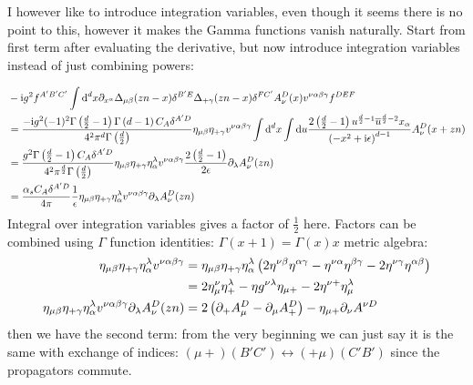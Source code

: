 I however like to introduce integration variables, even though it seems there is no point to this, however it makes the Gamma functions vanish naturally. Start from first term after evaluating the derivative, but now introduce integration variables instead of just combining powers:

\begin{align}
	&-\text{i} g^2f^{A'B'C'} \int \text{d} ^d x\partial_{x^\alpha} \Delta_{\mu \beta}(zn-x) \delta^{B' E} \Delta_{+ \gamma}(zn-x) \delta^{FC'} A_\nu^D(x) v^{\nu\alpha\beta\gamma} f^{DEF}
	\\
	&=
	\frac{-\text{i} g^2 (-1)^2 \Gamma\left(\frac{d}{2}-1\right)\Gamma\left(d-1\right)C_A\delta^{A'D}}{4^2 \pi^d\Gamma\left(\frac{d}{2}\right)} \eta_{\mu\beta} \eta_{+\gamma}v^{\nu\alpha\beta\gamma}\int \text{d} ^d x \int \text{d} u  \frac{2\left(\frac{d}{2}-1\right)u^{\frac{d}{2}-1}\overline u ^{\frac{d}{2}-2}x_\alpha}{\left(-x^2+\text{i} \epsilon\right)^{d-1}}A_\nu^D(x+zn)
	\\
	&=
	\frac{ g^2  \Gamma\left(\frac{d}{2}-1\right)C_A\delta^{A'D}}{4^2 \pi^{\frac{d}{2}}\Gamma\left(\frac{d}{2}\right)} \eta_{\mu\beta} \eta_{+\gamma}\eta_{\alpha}^{\lambda}v^{\nu\alpha\beta\gamma} \frac{2\left(\frac{d}{2}-1\right)}{2 \epsilon}\partial_\lambda A_\nu^D(zn)
	\\
	&=
	\frac{ \alpha_s  C_A\delta^{A'D}}{4 \pi}  \frac{1}{ \epsilon}\eta_{\mu\beta} \eta_{+\gamma}\eta_{\alpha}^{\lambda}v^{\nu\alpha\beta\gamma}\partial_\lambda A_\nu^D(zn)
\end{align}
Integral over integration variables gives a factor of $\frac{1}{2}$ here. Factors can be combined using $\Gamma$ function identities: $\Gamma(x+1)=\Gamma(x)x$
metric algebra:
\begin{align}
	\eta_{\mu\beta} \eta_{+\gamma}\eta_{\alpha}^{\lambda}v^{\nu\alpha\beta\gamma}
	&=
	\eta_{\mu\beta} \eta_{+\gamma}\eta_{\alpha}^{\lambda} \left(2 \eta^{\nu\beta}\eta^{\alpha\gamma} - \eta^{\nu \alpha} \eta^{\beta\gamma} -2\eta^{\nu \gamma} \eta^{\alpha\beta}\right)
	\\
	&=
	2\eta^\nu_\mu \eta^\lambda_+ - \eta g^{\nu\lambda}\eta_{\mu +} -2\eta^{\nu +} \eta^{\lambda}_\mu
	\\
	\eta_{\mu\beta} \eta_{+\gamma}\eta_{\alpha}^{\lambda}v^{\nu\alpha\beta\gamma}\partial_\lambda A_\nu^D(zn)
	&=
	2\left( \partial_+ A_\mu^D -\partial_\mu A_+^D \right) -\eta_{\mu +} \partial_\nu A^{\nu D}
\end{align}
then we have the second term: from the very beginning we can just say it is the same with exchange of indices: $(\mu +) (B'C') \leftrightarrow (+\mu )(C'B')$ since the propagators commute.
